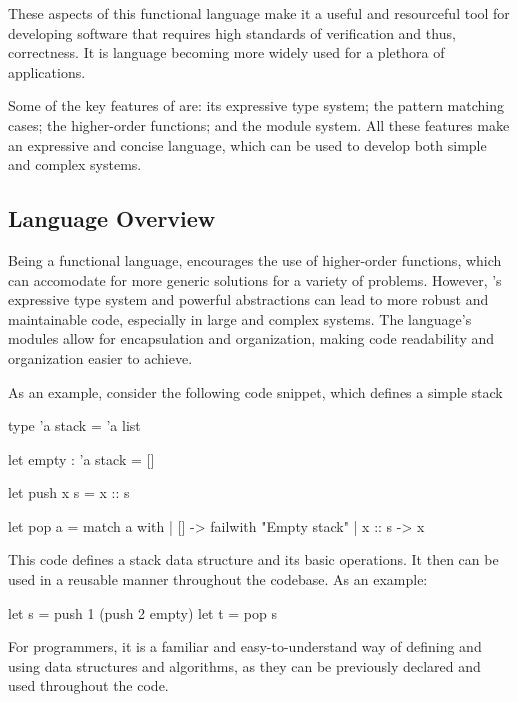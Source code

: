 These aspects of this functional language make it a useful and resourceful tool 
for developing software that requires high standards of verification and thus, correctness.
It is language becoming more widely used for a plethora of applications.

Some of the key features of \ocaml are: its expressive type system; the pattern matching cases; 
the higher-order functions; and the module system. All these features make \ocaml an expressive 
and concise language, which can be used to develop both simple and complex systems.

\subsection{Language Overview} %
\label{sub:language_overview}

Being a functional language, \ocaml encourages the use of higher-order functions, 
which can accomodate for more generic solutions for a variety of problems. However,
\ocaml's expressive type system and powerful abstractions can lead to more robust
and maintainable code, especially in large and complex systems. The language's 
modules allow for encapsulation and organization, making code readability and organization 
easier to achieve.

As an example, consider the following code snippet, which defines a simple stack

\begin{ocamlenv}
    type 'a stack = 'a list

    let empty : 'a stack = []

    let push x s = x :: s

    let pop a =
        match a with
        | [] -> failwith "Empty stack"
        | x :: s -> x
\end{ocamlenv}

This code defines a stack data structure and its basic operations. It then can be used 
in a reusable manner throughout the codebase. As an example:

\begin{ocamlenv}
    let s = push 1 (push 2 empty)
    let t = pop s
\end{ocamlenv}


For programmers, it is a familiar and easy-to-understand way of defining and using 
data structures and algorithms, as they can be previously declared and used throughout 
the code.


